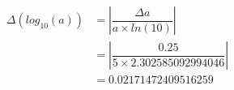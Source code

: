 \documentclass[a4paper]{article}
\begin{document}
\begin{align*}
\Delta \left( log_{ 10 }\left( a \right) \right) &= \left| \dfrac{ \Delta a }{ a \times ln \left( 10 \right) } \right| \\
&= \left| \dfrac{ 0.25 }{ 5 \times 2.302585092994046 } \right| \\
&= 0.02171472409516259
\end{align*}
\end{document}
